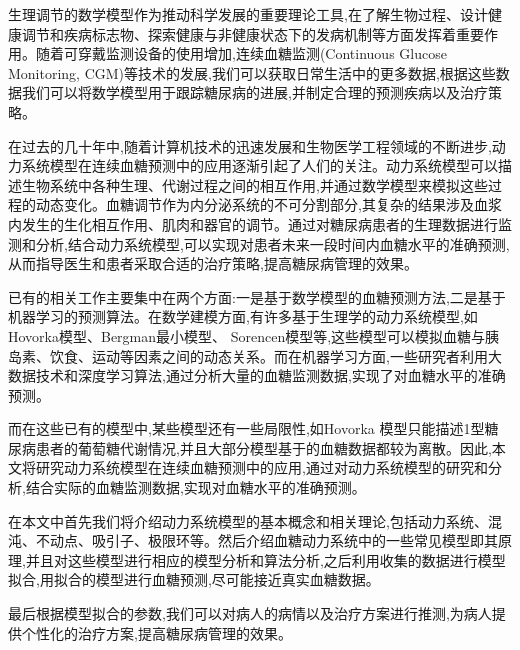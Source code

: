 生理调节的数学模型作为推动科学发展的重要理论工具,在了解生物过程、设计健康调节和疾病标志物、探索健康与非健康状态下的发病机制等方面发挥着重要作用\cite{bakhti2019modelling}。随着可穿戴监测设备的使用增加\cite{kim2020wearable},连续血糖监测(Continuous Glucose Monitoring, CGM)等技术的发展,我们可以获取日常生活中的更多数据,根据这些数据我们可以将数学模型用于跟踪糖尿病的进展\cite{ha2020type},并制定合理的预测疾病以及治疗策略。

在过去的几十年中,随着计算机技术的迅速发展和生物医学工程领域的不断进步,动力系统模型在连续血糖预测中的应用逐渐引起了人们的关注。动力系统模型可以描述生物系统中各种生理、代谢过程之间的相互作用,并通过数学模型来模拟这些过程的动态变化\cite{cobelli2009diabetes}。血糖调节作为内分泌系统的不可分割部分,其复杂的结果涉及血浆内发生的生化相互作用、肌肉和器官的调节\cite{zavala2019mathematical}。通过对糖尿病患者的生理数据进行监测和分析,结合动力系统模型,可以实现对患者未来一段时间内血糖水平的准确预测,从而指导医生和患者采取合适的治疗策略,提高糖尿病管理的效果。

已有的相关工作主要集中在两个方面:一是基于数学模型的血糖预测方法,二是基于机器学习的预测算法。在数学建模方面,有许多基于生理学的动力系统模型,如Hovorka模型、Bergman最小模型、 Sorencen模型等\cite{pompa2021comparison,mari2001model,de2000mathematical},这些模型可以模拟血糖与胰岛素、饮食、运动等因素之间的动态关系。而在机器学习方面,一些研究者利用大数据技术和深度学习算法,通过分析大量的血糖监测数据,实现了对血糖水平的准确预测。

而在这些已有的模型中,某些模型还有一些局限性,如Hovorka 模型只能描述1型糖尿病患者的葡萄糖代谢情况,并且大部分模型基于的血糖数据都较为离散。因此,本文将研究动力系统模型在连续血糖预测中的应用,通过对动力系统模型的研究和分析,结合实际的血糖监测数据,实现对血糖水平的准确预测。

在本文中首先我们将介绍动力系统模型的基本概念和相关理论,包括动力系统、混沌、不动点、吸引子、极限环等。然后介绍血糖动力系统中的一些常见模型即其原理,并且对这些模型进行相应的模型分析和算法分析,之后利用收集的数据进行模型拟合,用拟合的模型进行血糖预测,尽可能接近真实血糖数据。

最后根据模型拟合的参数,我们可以对病人的病情以及治疗方案进行推测,为病人提供个性化的治疗方案,提高糖尿病管理的效果。